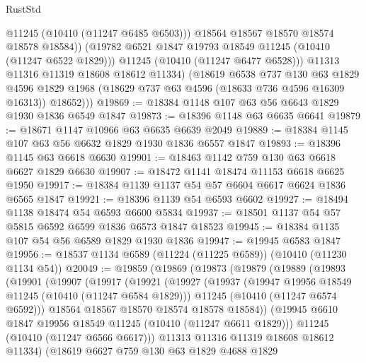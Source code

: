 \begin{lexlean}{RustStd}
\begin{coremodule}
                  @11245
                  (@10410 (@11247 @6485 @6503)))
                @18564
                @18567
                @18570
                @18574
                @18578
                @18584))
            (@19782 @6521 @1847 @19793 @18549 @11245 (@10410 (@11247 @6522 @1829)))
            @11245
            (@10410 (@11247 @6477 @6528)))
          @11313
          @11316
          @11319
          @18608
          @18612
          @11334)
        (@18619
          @6538
          @737
          @130
          @63
          @1829
          @4596
          @1829
          @1968
          (@18629 @737 @63 @4596 (@18633 @736 @4596 @16309 @16313))
          @18652)))
@19869 := @18384 @1148 @107 @63 @56 @6643 @1829 @1930 @1836 @6549 @1847
@19873 := @18396 @1148 @63 @6635 @6641
@19879 := @18671 @1147 @10966 @63 @6635 @6639 @2049
@19889 := @18384 @1145 @107 @63 @56 @6632 @1829 @1930 @1836 @6557 @1847
@19893 := @18396 @1145 @63 @6618 @6630
@19901 := @18463 @1142 @759 @130 @63 @6618 @6627 @1829 @6630
@19907 := @18472 @1141 @18474 @11153 @6618 @6625 @1950
@19917 := @18384 @1139 @1137 @54 @57 @6604 @6617 @6624 @1836 @6565 @1847
@19921 := @18396 @1139 @54 @6593 @6602
@19927 := @18494 @1138 @18474 @54 @6593 @6600 @5834
@19937 := @18501 @1137 @54 @57 @5815 @6592 @6599 @1836 @6573 @1847 @18523
@19945 := @18384 @1135 @107 @54 @56 @6589 @1829 @1930 @1836
@19947 := @19945 @6583 @1847
@19956 := @18537 @1134 @6589 (@11224 (@11225 @6589)) (@10410 (@11230 @1134 @54))
@20049 := @19859
    (@19869
      (@19873
        (@19879
          (@19889
            (@19893
              (@19901
                (@19907
                  (@19917
                    (@19921
                      (@19927
                        (@19937
                          (@19947 @19956 @18549 @11245 (@10410 (@11247 @6584 @1829)))
                          @11245
                          (@10410 (@11247 @6574 @6592)))
                        @18564
                        @18567
                        @18570
                        @18574
                        @18578
                        @18584))
                    (@19945 @6610 @1847 @19956 @18549 @11245 (@10410 (@11247 @6611 @1829)))
                    @11245
                    (@10410 (@11247 @6566 @6617)))
                  @11313
                  @11316
                  @11319
                  @18608
                  @18612
                  @11334)
                (@18619
                  @6627
                  @759
                  @130
                  @63
                  @1829
                  @4688
                  @1829

\end{coremodule}
\end{lexlean}
